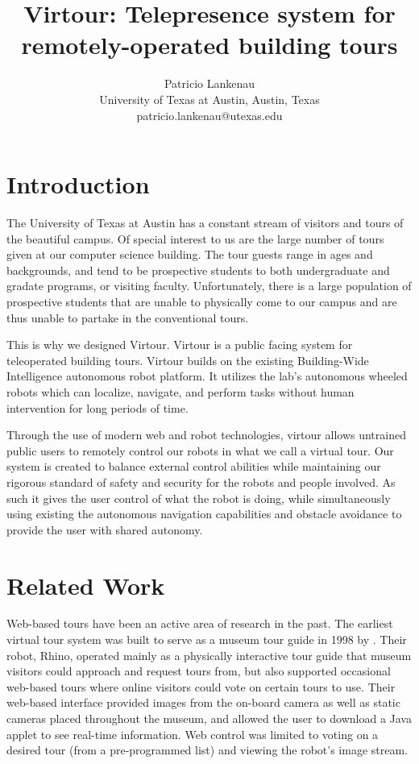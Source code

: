 \documentclass[
  oneside,
  11pt, a4paper,
  footinclude=true,
  headinclude=true,
  cleardoublepage=empty
]{article}
\title{Virtour: Telepresence system for remotely-operated building tours}
\author{Patricio Lankenau\\
        University of Texas at Austin, Austin, Texas\\
        patricio.lankenau@utexas.edu\\}
\date{}
\begin{document}
\maketitle

\tableofcontents
\newpage

\section{Introduction}

The University of Texas at Austin has a constant stream of visitors and tours
of the beautiful campus. Of special interest to us are the large number of
tours given at our computer science building. The tour guests range in ages and
backgrounds, and tend to be prospective students to both undergraduate and
gradate programs, or visiting faculty. Unfortunately, there is a large
population of prospective students that are unable to physically come to our
campus and are thus unable to partake in the conventional tours.

This is why we designed Virtour. Virtour is a public facing system for
teleoperated building tours. Virtour builds on the existing Building-Wide
Intelligence autonomous robot platform. It utilizes the lab's autonomous
wheeled robots which can localize, navigate, and perform tasks without human
intervention for long periods of time.

Through the use of modern web and robot technologies, virtour allows untrained
public users to remotely control our robots in what we call a virtual tour. Our
system is created to balance external control abilities while maintaining our
rigorous standard of safety and security for the robots and people involved. As
such it gives the user control of what the robot is doing, while simultaneously
using existing the autonomous navigation capabilities and obstacle avoidance to
provide the user with shared autonomy.

\section{Related Work}

Web-based tours have been an active area of research in the past. The earliest
virtual tour system was built to serve as a museum tour guide in 1998 by
\cite{burgard1998}. Their robot, Rhino, operated mainly as a physically
interactive tour guide that museum visitors could approach and request tours
from, but also supported occasional web-based tours where online visitors could
vote on certain tours to use. Their web-based interface provided images from
the on-board camera as well as static cameras placed throughout the museum, and
allowed the user to download a Java applet to see real-time information. Web
control was limited to voting on a desired tour (from a pre-programmed list)
and viewing the robot's image stream.
\end{document}
